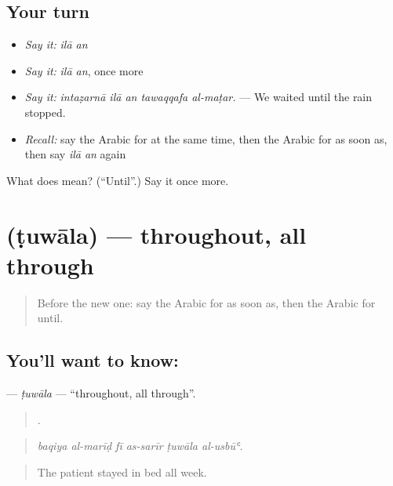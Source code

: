 \subsection*{Your turn}
\begin{itemize}
\raggedright
  \item \emph{Say it:} \emph{ilā an}
  \item \emph{Say it:} \emph{ilā an}, once more
  \item \emph{Say it:} \emph{intaẓarnā ilā an tawaqqafa al-maṭar.} — We waited until the rain stopped.
  \item \emph{Recall:} say the Arabic for at the same time, then the Arabic for as soon as, then say \emph{ilā an} again
\end{itemize}

\begin{tcolorbox}[breakable,colback=teal!4,colframe=teal!35!black,title={Before you move on}]
What does   mean? (\textquotedblleft{}Until\textquotedblright{}.) Say it once more.
\end{tcolorbox}
\section[\texorpdfstring{\ar{طوال} (ṭuwāla)}{طوال (ṭuwāla)}]{ (ṭuwāla) — throughout, all through}

\label{lesson:AR-C327-tuwala}



\begin{quote}
Before the new one: say the Arabic for as soon as, then the Arabic for until.
\end{quote}

\subsection*{You'll want to know: }
\textbf{} — \emph{ṭuwāla} — \textquotedblleft{}throughout, all through\textquotedblright{}.

\begin{quote}
     .
\end{quote}

\begin{quote}
\emph{baqiya al-marīḍ fī as-sarīr ṭuwāla al-usbūʿ.}
\end{quote}

\begin{quote}
The patient stayed in bed all week.
\end{quote}

